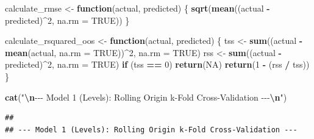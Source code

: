 \documentclass[
]{article}
\newenvironment{Shaded}{\begin{snugshade}}{\end{snugshade}}
\newcommand{\AttributeTok}[1]{\textcolor[rgb]{0.13,0.29,0.53}{#1}}
\newcommand{\ConstantTok}[1]{\textcolor[rgb]{0.56,0.35,0.01}{#1}}
\newcommand{\ControlFlowTok}[1]{\textcolor[rgb]{0.13,0.29,0.53}{\textbf{#1}}}
\newcommand{\DecValTok}[1]{\textcolor[rgb]{0.00,0.00,0.81}{#1}}
\newcommand{\FunctionTok}[1]{\textcolor[rgb]{0.13,0.29,0.53}{\textbf{#1}}}
\newcommand{\NormalTok}[1]{#1}
\newcommand{\OtherTok}[1]{\textcolor[rgb]{0.56,0.35,0.01}{#1}}
\newcommand{\SpecialCharTok}[1]{\textcolor[rgb]{0.81,0.36,0.00}{\textbf{#1}}}
\newcommand{\StringTok}[1]{\textcolor[rgb]{0.31,0.60,0.02}{#1}}
\begin{document}
\begin{Shaded}
\begin{Highlighting}[]
\NormalTok{  calculate\_rmse }\OtherTok{\textless{}{-}} \ControlFlowTok{function}\NormalTok{(actual, predicted) \{}
    \FunctionTok{sqrt}\NormalTok{(}\FunctionTok{mean}\NormalTok{((actual }\SpecialCharTok{{-}}\NormalTok{ predicted)}\SpecialCharTok{\^{}}\DecValTok{2}\NormalTok{, }\AttributeTok{na.rm =} \ConstantTok{TRUE}\NormalTok{))}
\NormalTok{  \}}
  
\NormalTok{  calculate\_rsquared\_oos }\OtherTok{\textless{}{-}} \ControlFlowTok{function}\NormalTok{(actual, predicted) \{}
\NormalTok{    tss }\OtherTok{\textless{}{-}} \FunctionTok{sum}\NormalTok{((actual }\SpecialCharTok{{-}} \FunctionTok{mean}\NormalTok{(actual, }\AttributeTok{na.rm =} \ConstantTok{TRUE}\NormalTok{))}\SpecialCharTok{\^{}}\DecValTok{2}\NormalTok{, }\AttributeTok{na.rm =} \ConstantTok{TRUE}\NormalTok{)}
\NormalTok{    rss }\OtherTok{\textless{}{-}} \FunctionTok{sum}\NormalTok{((actual }\SpecialCharTok{{-}}\NormalTok{ predicted)}\SpecialCharTok{\^{}}\DecValTok{2}\NormalTok{, }\AttributeTok{na.rm =} \ConstantTok{TRUE}\NormalTok{)}
    \ControlFlowTok{if}\NormalTok{ (tss }\SpecialCharTok{==} \DecValTok{0}\NormalTok{) }\FunctionTok{return}\NormalTok{(}\ConstantTok{NA}\NormalTok{)}
    \FunctionTok{return}\NormalTok{(}\DecValTok{1} \SpecialCharTok{{-}}\NormalTok{ (rss }\SpecialCharTok{/}\NormalTok{ tss))}
\NormalTok{  \}}
  
  \FunctionTok{cat}\NormalTok{(}\StringTok{"}\SpecialCharTok{\textbackslash{}n}\StringTok{{-}{-}{-} Model 1 (Levels): Rolling Origin k{-}Fold Cross{-}Validation {-}{-}{-}}\SpecialCharTok{\textbackslash{}n}\StringTok{"}\NormalTok{)}
\end{Highlighting}
\end{Shaded}

\begin{verbatim}
## 
## --- Model 1 (Levels): Rolling Origin k-Fold Cross-Validation ---
\end{verbatim}
\end{document}
